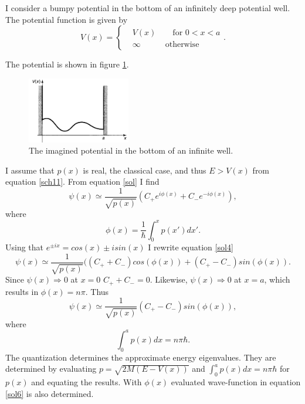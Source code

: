 \begin{example}
	I consider a bumpy potential in the bottom of an infinitely deep potential well. The potential function is given by
	\begin{equation}
		V(x)=\begin{cases}
			&V(x) \qquad \mbox{for $0<x<a$} \\
			&\infty \qquad \quad \mbox{otherwise}
		\end{cases}.
	\end{equation} 
	
	The potential is shown in figure \ref{fig:wkb1}.
	\begin{figure}[H]
		\captionsetup{width=1\textwidth}
		\centering
		\includegraphics[width=0.4\textwidth]{figures/wkb1}
		\caption{The imagined potential in the bottom of an infinite well.}
		\label{fig:wkb1}
	\end{figure}
	
	I assume that $p(x)$ is real, the classical case, and thus $E>V(x)$ from equation \eqref{sch11}. From equation \eqref{sol} I find
	\begin{equation}
		\psi(x)\simeq\frac{1}{\sqrt{p(x)}}(C_+e^{i\phi(x)}+C_-e^{-i\phi(x)}),
		\label{sol4}
	\end{equation} 
	where
	\begin{equation}
		\phi(x)=\frac{1}{\hbar}\int_{0}^{x} p(x')dx'.
	\end{equation} 
	Using that $e^{\pm i x}=cos(x)\pm isin(x)$ I rewrite equation \eqref{sol4}
	\begin{equation}
		\psi(x)\simeq\frac{1}{\sqrt{p(x)}}((C_++C_-)cos(\phi(x))+(C_+-C_-)sin(\phi(x)).
		\label{sol5}
	\end{equation} 
	Since $\psi(x)\Rightarrow0$ at $x=0$ $C_++C_-=0$. Likewise, $\psi(x)\Rightarrow0$ at $x=a$, which results in $\phi(x)=n\pi$. Thus
	\begin{equation}
		\psi(x)\simeq\frac{1}{\sqrt{p(x)}}(C_+-C_-)sin(\phi(x)),
		\label{sol6}
	\end{equation} 
	where
	\begin{equation}
		\int_{0}^{a}p(x)dx=n\pi\hbar.
	\end{equation} 
	The quantization determines the approximate energy eigenvalues. They are determined by evaluating $p=\sqrt{2M(E-V(x))}$ and $\int_{0}^{a}p(x)dx=n\pi\hbar$ for $p(x)$ and equating the results. With $\phi(x)$ evaluated wave-function in equation \eqref{sol6} is also determined.
\end{example}


